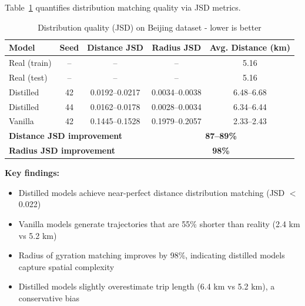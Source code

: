 Table~\ref{tab:jsd-results} quantifies distribution matching quality via JSD metrics.

\begin{table}[h]
    \centering
    \caption{Distribution quality (JSD) on Beijing dataset - lower is better}
    \label{tab:jsd-results}
    \small
    \begin{tabular}{lcccc}
        \toprule
        \textbf{Model}                                        & \textbf{Seed}                         & \textbf{Distance JSD} & \textbf{Radius JSD} & \textbf{Avg. Distance (km)} \\
        \midrule
        Real (train)                                          & --                                    & --                    & --                  & 5.16                        \\
        Real (test)                                           & --                                    & --                    & --                  & 5.16                        \\
        \midrule
        Distilled                                             & 42                                    & 0.0192--0.0217        & 0.0034--0.0038      & 6.48--6.68                  \\
        Distilled                                             & 44                                    & 0.0162--0.0178        & 0.0028--0.0034      & 6.34--6.44                  \\
        Vanilla                                               & 42                                    & 0.1445--0.1528        & 0.1979--0.2057      & 2.33--2.43                  \\
        \midrule
        \multicolumn{3}{l}{\textbf{Distance JSD improvement}} & \multicolumn{2}{c}{\textbf{87--89\%}}                                                                             \\
        \multicolumn{3}{l}{\textbf{Radius JSD improvement}}   & \multicolumn{2}{c}{\textbf{98\%}}                                                                                 \\
        \bottomrule
    \end{tabular}
\end{table}

\textbf{Key findings:}
\begin{itemize}[noitemsep,topsep=0pt]
    \item Distilled models achieve near-perfect distance distribution matching (JSD $<$ 0.022)
    \item Vanilla models generate trajectories that are 55\% shorter than reality (2.4 km vs 5.2 km)
    \item Radius of gyration matching improves by 98\%, indicating distilled models capture spatial complexity
    \item Distilled models slightly overestimate trip length (6.4 km vs 5.2 km), a conservative bias
\end{itemize}

